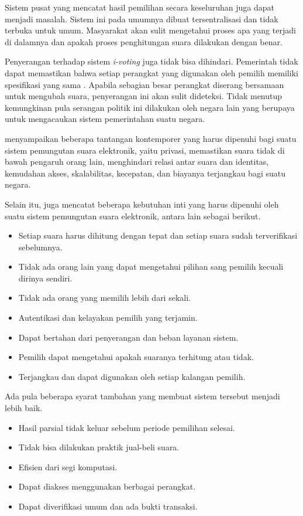 Sistem pusat yang mencatat hasil pemilihan secara keseluruhan juga dapat menjadi masalah. Sistem ini pada umumnya dibuat tersentralisasi dan tidak terbuka untuk umum. Masyarakat akan sulit mengetahui proses apa yang terjadi di dalamnya dan apakah proses penghitungan suara dilakukan dengan benar.

Penyerangan terhadap sistem \textit{i-voting} juga tidak bisa dihindari. Pemerintah tidak dapat memastikan bahwa setiap perangkat yang digunakan oleh pemilih memiliki spesifikasi yang sama \citep{mci/Filho2008}. Apabila sebagian besar perangkat diserang bersamaan untuk mengubah suara, penyerangan ini akan sulit dideteksi. Tidak menutup kemungkinan pula serangan politik ini dilakukan oleh negara lain yang berupaya untuk mengacaukan sistem pemerintahan suatu negara.

\cite{comparitiveanalysis} menyampaikan beberapa tantangan kontemporer yang harus dipenuhi bagi suatu sistem pemungutan suara elektronik, yaitu privasi, memastikan suara tidak di bawah pengaruh orang lain, menghindari relasi antar suara dan identitas, kemudahan akses, skalabilitas, kecepatan, dan biayanya terjangkau bagi suatu negara.

Selain itu, \cite{wang2017review} juga mencatat beberapa kebutuhan inti yang harus dipenuhi oleh suatu sistem pemungutan suara elektronik, antara lain sebagai berikut.

\begin{itemize}
    \setlength\itemsep{-0.5em}
    \item Setiap suara harus dihitung dengan tepat dan setiap suara sudah terverifikasi sebelumnya.
    \item Tidak ada orang lain yang dapat mengetahui pilihan sang pemilih kecuali dirinya sendiri.
    \item Tidak ada orang yang memilih lebih dari sekali.
    \item Autentikasi dan kelayakan pemilih yang terjamin.
    \item Dapat bertahan dari penyerangan dan beban layanan sistem.
    \item Pemilih dapat mengetahui apakah suaranya terhitung atau tidak.
    \item Terjangkau dan dapat digunakan oleh setiap kalangan pemilih.
\end{itemize}

Ada pula beberapa syarat tambahan yang membuat sistem tersebut menjadi lebih baik.

\begin{itemize}
    \setlength\itemsep{-0.5em}
    \item Hasil parsial tidak keluar sebelum periode pemilihan selesai.
    \item Tidak bisa dilakukan praktik jual-beli suara.
    \item Efisien dari segi komputasi.
    \item Dapat diakses menggunakan berbagai perangkat.
    \item Dapat diverifikasi umum dan ada bukti transaksi.
\end{itemize}

